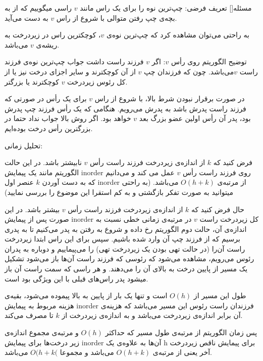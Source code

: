 
‌مسئله[]
تعریف فرضی: چپ‌ترین نوه را برای یک راس مانند $v$ راسی میگوییم که از به بچه‌ی چپ رفتن متوالی با شروع از راس $v$ به دست می‌آید.

به راحتی می‌توان مشاهده کرد که چپ‌ترین نوه‌ی $v$، کوچکترین راس در زیردرخت به ریشه‌‌ی $v$ می‌باشد.

توضیح الگوریتم روی رأس $v$:
اگر $v$ فرزند راست داشت جواب چپ‌ترین نوه‌ی فرزند راست $v$می‌باشد. چون که فرزندان چپ $v$ از آن کوچکترند و سایر اجزای درخت نیز یا از کل رئوس زیردرخت $v$ کوچکترند یا بزرگتر. 

در صورت برقرار نبودن شرط بالا، با شروع از راس $v$ برای یک رأس در صورتی که فرزند راست پدرش باشد به پدرش می‌رویم. هنگامی که یک رأس فرزند چپ پدرش بود، پدر آن رأس اولین عضو بزرگ بعد $v$ خواهد بود.
اگر روش بالا جواب نداد حتما در بزرگترین رأس درخت بوده‌ایم.

تحلیل زمانی:

فرض کنید که $k$ از اندازه‌ی زیردرخت فرزند راست رأس $v$ نابیشتر باشد. در این حالت الگوریتم مانند یک پیمایش inorder روی فرزند راست رأس $v$ عمل می کند و می‌دانیم که به دست آوردن $k$  عنصر اول inorder از مرتبه‌‌ی
$O(h+k)$
می‌باشد. (به راحتی میتوانید به صورت تفکر بازگشتی و به کم استقرا این موضوع را بررسی نمایید)

حال فرض کنید که $k$ از اندازه‌ی زیردرخت فرزند راست رأس $v$ بیشتر باشد. در این صورت پس از پیمایش inorder کل زیردرخت راست $v$ در مرتبه‌ی زمانی خطی نسبت به اندازه‌ی آن، حالت دوم الگوریتم رخ داده و شروع به رفتن به پدر می‌کنیم تا به پدری برسیم که از فرزند چپ آن وارد شده باشیم. سپس برای این راس ابتدا زیردرخت راست آن‌را (در حالت تهی بودن یک زیردرخت تهی) را می‌پیماییم و دوباره به پدران رئوس می‌رویم، مشاهده می‌شود که رئوسی که فرزند راست آن‌ها باز می‌شود تشکیل یک مسیر از پایین درخت به بالای آن را می‌دهند. و هر راسی که سمت راست آن باز میشود پدر راس‌های قبلی با این ویژگی بود است.

طول این مسیر از $O(h)$ است و تنها یک بار از پایین به بالا پیموده می‌شود، بقیه‌ی هزینه مربوط به پیمایش inorder فرزندان راست رئوس این مسیر می‌باشد که هزینه‌ی آن برابر اندازه‌ی زیردرخت می‌باشد و به اندازه‌ی زیردرخت از $k$ تا مصرف می‌کند.

پس زمان الگوریتم از مرتبه‌ی طول مسیر که حداکثر $O(h)$ و مرتبه‌ی مجموع اندازه‌ی زیر درخت‌ها برای پیمایش inorder آن‌ها به علاوه‌ی یک h برای پیمایش ناقص زیردرخت آخر یعنی از مرتبه‌ی $O(h+k)$ می‌باشد و مجموعا $O(h+k($ می‌باشد.

